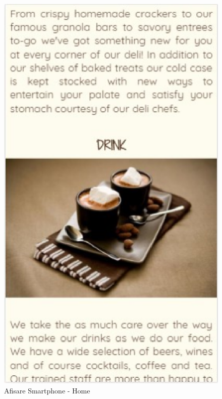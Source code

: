 \documentclass[11pt]{article}
\begin{document}
\begin{figure}[h]
\includegraphics{images/74.eps}
\caption{Afisare Smartphone - Home}
\end{figure}
\end{document}
